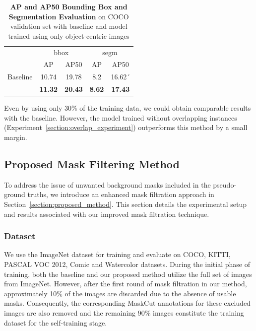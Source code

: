 \begin{table}[htbp]
	\centering
	\begin{tabular}{c|cc|cc}
		\toprule
		\multirow{2}{*}{} & \multicolumn{2}{c|}{bbox} & \multicolumn{2}{c}{segm} \\ \cmidrule{2-5}
		& AP & AP50 & AP & AP50 \\ \midrule
		Baseline & 
		10.74 & 19.78 & 8.2 & 16.62´ \\
		\midrule
		\vtop{\hbox{\strut Model Trained With}\hbox{\strut Object-Centric Images}} & \multirow{2}{*}{\textbf{11.32}} & \multirow{2}{*}{\textbf{20.43}} & \multirow{2}{*}{\textbf{8.62}} & \multirow{2}{*}{\textbf{17.43}} \\
		\bottomrule
	\end{tabular}
	\caption[\textbf{Evaluation of Baseline vs Model Trained With Only Object-Centric Images}]{\textbf{AP and AP50 Bounding Box and Segmentation Evaluation} on COCO validation set with baseline and model trained using only object-centric images}
	\label{tab:object-centric-analysis}
\end{table}

Even by using only 30\% of the training data, we could obtain comparable results with the baseline. However, the model trained without overlapping instances (Experiment~\ref{section:overlap_experiment}) outperforms this method by a small margin.

\subsection{Proposed Mask Filtering Method}
\label{section:mask_refinement_experiment}
To address the issue of unwanted background masks included in the pseudo-ground truths, we introduce an enhanced mask filtration approach in Section~\ref{section:proposed_method}. This section details the experimental setup and results associated with our improved mask filtration technique.

\subsubsection{Dataset}
We use the ImageNet dataset for training and evaluate on COCO, KITTI, PASCAL VOC 2012, Comic and Watercolor datasets. During the initial phase of training, both the baseline and our proposed method utilize the full set of images from ImageNet. However, after the first round of mask filtration in our method, approximately 10\% of the images are discarded due to the absence of usable masks. Consequently, the corresponding MaskCut annotations for these excluded images are also removed and the remaining 90\% images constitute the training dataset for the self-training stage.

